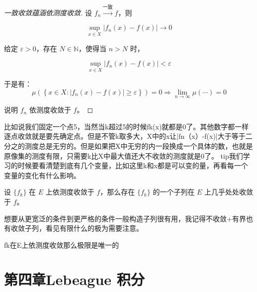 \documentclass[lang=cn,10pt]{elegantbook}
\begin{document}
\begin{proof}[一致收敛蕴涵依测度收敛]
设 $f_n \overset{\text{一致}}{\longrightarrow} f$，则

\[
\sup_{x \in X} |f_n(x) - f(x)| \to 0
\]

给定 $\varepsilon > 0$，存在 $N \in \mathbb{N}$，使得当 $n > N$ 时，

\[
\sup_{x \in X} |f_n(x) - f(x)| < \varepsilon
\]

于是有：
\[
\mu\left(\left\{x \in X : |f_n(x) - f(x)| \ge \varepsilon \right\} \right) = 0
\Rightarrow \lim_{n \to \infty} \mu(\cdots) = 0
\]

说明 $f_n$ 依测度收敛于 $f$。
\end{proof}
比如说我们固定一个点5，当然当k超过5的时候fk(x)就都是0了。其他数字都一样逐点收敛就是要先确定点。但是不管k取多大，X中的x让|fn（x）-f(x)|大于等于二分之的测度总是无穷的。但是如果把X中无穷的内一段换成一个具体的数，也就是原像集的测度有限，只需要k比X中最大值还大不收敛的测度就是0了。
tip我们学习的时候要看清楚到底有几个变量，比如这里k和x都是可以变的量，再看每一个变量的变化有什么影响。
\begin{theorem}[Riesz 定理]
设 $\{f_k\}$ 在 $E$ 上依测度收敛于 $f$，那么存在 $\{f_k\}$ 的一个子列在 $E$ 上几乎处处收敛于 $f$。
\end{theorem}
想要从更宽泛的条件到更严格的条件一般构造子列很有用，我记得不收敛+有界也有收敛子列，看见有限什么的极为需要注意。
\begin{corollary}[依测度收敛的极限的唯一性]
    {fk}在E上依测度收敛那么极限是唯一的
\end{corollary}
\chapter{第四章Lebeague 积分}
\end{document}
